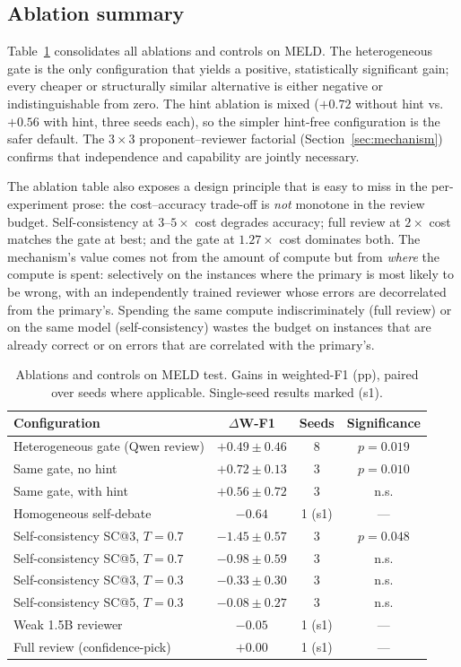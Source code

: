 \documentclass[final,5p,times,twocolumn]{elsarticle}
\begin{document}
\subsection{Ablation summary}
\label{sec:ablation}
Table~\ref{tab:ablations} consolidates all ablations and controls on MELD.
The heterogeneous gate is the only configuration that yields a positive,
statistically significant gain; every cheaper or structurally similar
alternative is either negative or indistinguishable from zero. The hint
ablation is mixed ($+0.72$ without hint vs.\ $+0.56$ with hint, three seeds
each), so the simpler hint-free configuration is the safer default. The
$3\times3$ proponent--reviewer factorial (Section~\ref{sec:mechanism})
confirms that independence and capability are jointly necessary.

The ablation table also exposes a design principle that is easy to miss in
the per-experiment prose: the cost--accuracy trade-off is \emph{not}
monotone in the review budget. Self-consistency at $3$--$5\times$ cost
degrades accuracy; full review at $2\times$ cost matches the gate at best;
and the gate at $1.27\times$ cost dominates both. The mechanism's value
comes not from the amount of compute but from \emph{where} the compute is
spent: selectively on the instances where the primary is most likely to be
wrong, with an independently trained reviewer whose errors are decorrelated
from the primary's. Spending the same compute indiscriminately (full
review) or on the same model (self-consistency) wastes the budget on
instances that are already correct or on errors that are correlated with
the primary's.

\begin{table}[t]
\centering
\caption{Ablations and controls on MELD test. Gains in weighted-F1 (pp),
paired over seeds where applicable. Single-seed results marked (s1).}
\label{tab:ablations}
\small
\begin{tabular}{lccc}
\toprule
Configuration & $\Delta$W-F1 & Seeds & Significance \\
\midrule
Heterogeneous gate (Qwen review) & $+0.49\pm0.46$ & 8 & $p{=}0.019$ \\
\quad Same gate, no hint & $+0.72\pm0.13$ & 3 & $p{=}0.010$ \\
\quad Same gate, with hint & $+0.56\pm0.72$ & 3 & n.s. \\
\midrule
Homogeneous self-debate & $-0.64$ & 1 (s1) & --- \\
Self-consistency SC@3, $T{=}0.7$ & $-1.45\pm0.57$ & 3 & $p{=}0.048$ \\
Self-consistency SC@5, $T{=}0.7$ & $-0.98\pm0.59$ & 3 & n.s. \\
Self-consistency SC@3, $T{=}0.3$ & $-0.33\pm0.30$ & 3 & n.s. \\
Self-consistency SC@5, $T{=}0.3$ & $-0.08\pm0.27$ & 3 & n.s. \\
Weak 1.5B reviewer & $-0.05$ & 1 (s1) & --- \\
Full review (confidence-pick) & $+0.00$ & 1 (s1) & --- \\
\bottomrule
\end{tabular}
\end{table}
\end{document}
